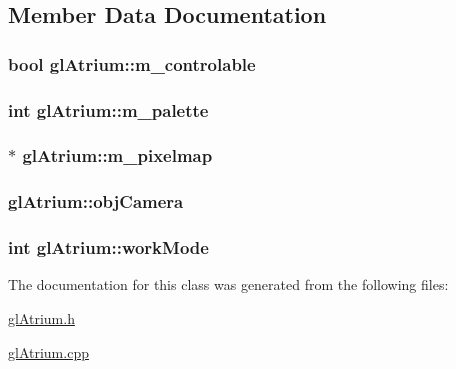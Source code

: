 \subsection{Member Data Documentation}
\hypertarget{classgl_atrium_a3d9b6da1e18ad8b6125d64afde32c130}{
\subsubsection[{m\+\_\+controlable}]{\setlength{\rightskip}{0pt plus 5cm}bool gl\+Atrium\+::m\+\_\+controlable}}\label{classgl_atrium_a3d9b6da1e18ad8b6125d64afde32c130}
\hypertarget{classgl_atrium_afbce9f1a1572de51914bbf7b574c75ad}{
\subsubsection[{m\+\_\+palette}]{\setlength{\rightskip}{0pt plus 5cm}int gl\+Atrium\+::m\+\_\+palette}}\label{classgl_atrium_afbce9f1a1572de51914bbf7b574c75ad}
\hypertarget{classgl_atrium_a594ad841f258f1a022dd813e29600f2e}{
\subsubsection[{m\+\_\+pixelmap}]{$\ast$ gl\+Atrium\+::m\+\_\+pixelmap}}\label{classgl_atrium_a594ad841f258f1a022dd813e29600f2e}
\hypertarget{classgl_atrium_a5c68ba4ba236f29f3f96aded86daf029}{
\subsubsection[{obj\+Camera}]{ gl\+Atrium\+::obj\+Camera}}\label{classgl_atrium_a5c68ba4ba236f29f3f96aded86daf029}
\hypertarget{classgl_atrium_a7f57bee89c32d82bdadcb2ff8e5518a3}{
\subsubsection[{work\+Mode}]{\setlength{\rightskip}{0pt plus 5cm}int gl\+Atrium\+::work\+Mode}}\label{classgl_atrium_a7f57bee89c32d82bdadcb2ff8e5518a3}


The documentation for this class was generated from the following files\+:\begin{DoxyCompactItemize}
\item 
\hyperlink{gl_atrium_8h}{gl\+Atrium.\+h}\item 
\hyperlink{gl_atrium_8cpp}{gl\+Atrium.\+cpp}\end{DoxyCompactItemize}
